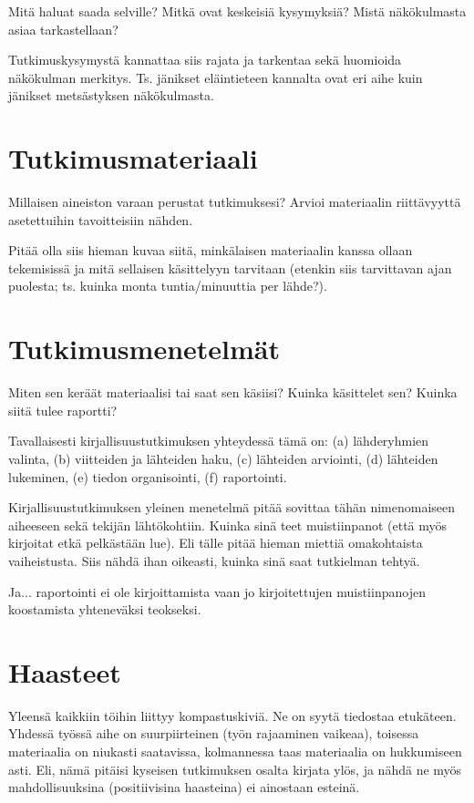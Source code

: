 \documentclass[12pt,a4paper,finnish,oneside]{article}
\begin{document}
Mitä haluat saada selville? Mitkä ovat keskeisiä kysymyksiä? Mistä
näkökulmasta asiaa tarkastellaan?

Tutkimuskysymystä kannattaa siis rajata ja tarkentaa sekä huomioida
näkökulman merkitys. Ts. jänikset eläintieteen kannalta ovat eri aihe
kuin jänikset metsästyksen näkökulmasta.

\section{Tutkimusmateriaali}

Millaisen aineiston varaan perustat tutkimuksesi? Arvioi materiaalin
riittävyyttä asetettuihin tavoitteisiin nähden.

Pitää olla siis hieman kuvaa siitä, minkälaisen materiaalin kanssa
ollaan tekemisissä ja mitä sellaisen käsittelyyn tarvitaan (etenkin
siis tarvittavan ajan puolesta; ts. kuinka monta tuntia/minuuttia per
lähde?).

\section{Tutkimusmenetelmät}

Miten sen keräät materiaalisi tai saat sen käsiisi? Kuinka käsittelet
sen? Kuinka siitä tulee raportti?

Tavallaisesti kirjallisuustutkimuksen yhteydessä tämä on:
(a) lähderyhmien valinta,
(b) viitteiden ja lähteiden haku,
(c) lähteiden arviointi,
(d) lähteiden lukeminen,
(e) tiedon organisointi,
(f) raportointi.  %

Kirjallisuustutkimuksen yleinen menetelmä pitää sovittaa tähän
nimenomaiseen aiheeseen sekä tekijän lähtökohtiin. Kuinka sinä teet
muistiinpanot (että myös kirjoitat etkä pelkästään lue). Eli tälle
pitää hieman miettiä omakohtaista vaiheistusta. Siis nähdä ihan
oikeasti, kuinka sinä saat tutkielman tehtyä.

Ja... raportointi ei ole kirjoittamista vaan jo kirjoitettujen
muistiinpanojen koostamista yhteneväksi teokseksi.

\section{Haasteet}

Yleensä kaikkiin töihin liittyy kompastuskiviä. Ne on syytä tiedostaa
etukäteen. Yhdessä työssä aihe on suurpiirteinen (työn rajaaminen
vaikeaa), toisessa materiaalia on niukasti saatavissa, kolmannessa
taas materiaalia on hukkumiseen asti.  Eli, nämä pitäisi kyseisen
tutkimuksen osalta kirjata ylös, ja nähdä ne myös mahdollisuuksina
(positiivisina haasteina) ei ainostaan esteinä.
\end{document}
